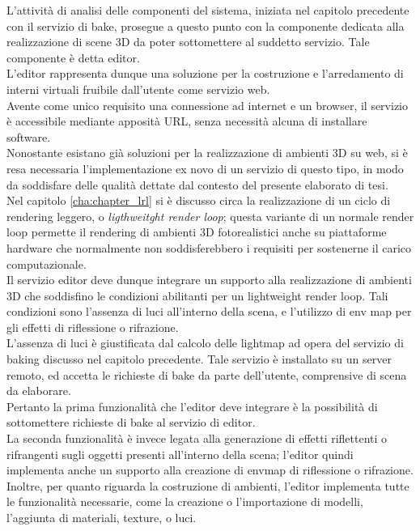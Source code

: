 L’attività di analisi delle componenti del sistema, iniziata nel capitolo precedente con il servizio di bake, prosegue a questo punto con la componente dedicata alla realizzazione di scene 3D da poter sottomettere al suddetto servizio. Tale componente è detta editor.
\\
L’editor rappresenta dunque una soluzione per la costruzione e l’arredamento di interni virtuali fruibile dall’utente come servizio web.
\\
Avente come unico requisito una connessione ad internet e un browser, il servizio è accessibile mediante apposità URL, senza necessità alcuna di installare software.
\\ 
Nonostante esistano già soluzioni per la realizzazione di ambienti 3D su web, si è resa necessaria l’implementazione ex novo di un servizio di questo tipo, in modo da soddisfare delle qualità dettate dal contesto del presente elaborato di tesi.
\\
Nel capitolo \ref{cha:chapter_lrl} si è discusso circa la realizzazione di un ciclo di rendering leggero, o \emph{ligthweitght render loop}; questa variante di un normale render loop permette il rendering di ambienti 3D fotorealistici anche su piattaforme hardware che normalmente non soddisferebbero i requisiti per sostenerne il carico computazionale.
\\
Il servizio editor deve dunque integrare un supporto alla realizzazione di ambienti 3D che soddisfino le condizioni abilitanti per un lightweight render loop. Tali condizioni sono l’assenza di luci all’interno della scena, e l’utilizzo di env map per gli effetti di riflessione o rifrazione.
\\
L’assenza di luci è giustificata dal calcolo delle lightmap ad opera del servizio di baking discusso nel capitolo precedente. Tale servizio è installato su un server remoto, ed accetta le richieste di bake da parte dell’utente, comprensive di scena da elaborare.
\\ 
Pertanto la prima funzionalità che l’editor deve integrare è la possibilità di sottomettere richieste di bake al servizio di editor.
\\
La seconda funzionalità è invece legata alla generazione di effetti riflettenti o rifrangenti sugli oggetti presenti all’interno della scena; l’editor quindi implementa anche un supporto alla creazione di envmap di riflessione o rifrazione.
\\
Inoltre, per quanto riguarda la costruzione di ambienti, l’editor implementa tutte le funzionalità necessarie, come la creazione o l’importazione di modelli, l’aggiunta di materiali, texture, o luci.
